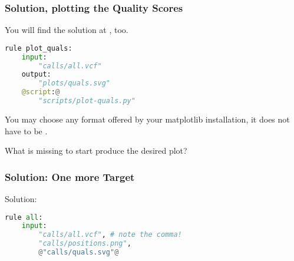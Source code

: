 \begin{frame}[fragile]
  \frametitle{Solution, plotting the Quality Scores}
  You will find the solution at , too.
  \begin{lstlisting}[language=Python,style=Python]
rule plot_quals:
    input:
        "calls/all.vcf"
    output:
        "plots/quals.svg"
    @script:@
        "scripts/plot-quals.py"
  \end{lstlisting}
  \begin{hint}
  	You may choose any format offered by your matplotlib installation, it does not have to be .
  \end{hint}
  \pause
  \begin{question}
  	What is missing to start produce the desired plot?
  \end{question}
\end{frame}

\begin{frame}[fragile]
	\frametitle{Solution: One more Target}
	
	Solution:
	\begin{lstlisting}[language=Python,style=Python]
rule all:
    input:
        "calls/all.vcf", # note the comma!
        "calls/positions.png",
        @"calls/quals.svg"@
	\end{lstlisting}
\end{frame}

